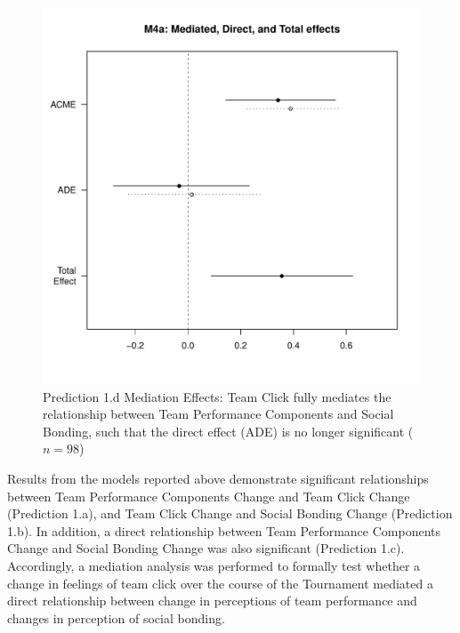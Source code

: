 \begin{CJK}{UTF8}{gbsn}
  \begin{figure}[htbp]
    \centering
    \includegraphics[scale = .5]{images/MLM4aMediationEffectsOffline1}
    \caption{Prediction 1.d Mediation Effects: Team Click fully mediates the relationship between Team Performance Components and Social Bonding, such that the direct effect (ADE) is no longer significant ($n = 98$)}
    \label{fig:MLM4aMediationAnalysis}
  \end{figure}




  Results from the models reported above demonstrate significant relationships between Team Performance Components Change and Team Click Change (Prediction 1.a), and Team Click Change and Social Bonding Change (Prediction 1.b).  In addition, a direct relationship between Team Performance Components Change and Social Bonding Change was also significant (Prediction 1.c).  Accordingly, a mediation analysis was performed to formally test whether a change in feelings of team click over the course of the Tournament mediated a direct relationship between change in perceptions of team performance and changes in perception of social bonding.\\


\end{CJK}
